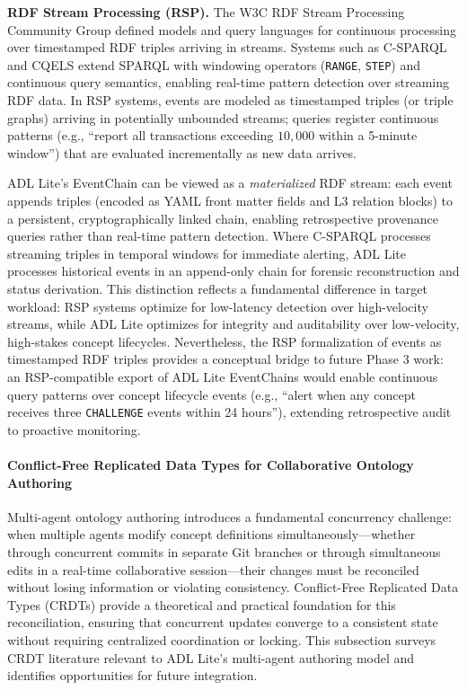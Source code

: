 \textbf{RDF Stream Processing (RSP).} The W3C RDF Stream Processing Community Group defined models and query languages for continuous processing over timestamped RDF triples arriving in streams\cite{ref52}. Systems such as C-SPARQL\cite{ref53} and CQELS\cite{ref54} extend SPARQL with windowing operators (\texttt{RANGE}, \texttt{STEP}) and continuous query semantics, enabling real-time pattern detection over streaming RDF data. In RSP systems, events are modeled as timestamped triples (or triple graphs) arriving in potentially unbounded streams; queries register continuous patterns (e.g., ``report all transactions exceeding $10,000$ within a 5-minute window'') that are evaluated incrementally as new data arrives.

ADL Lite's EventChain can be viewed as a \emph{materialized} RDF stream: each event appends triples (encoded as YAML front matter fields and L3 relation blocks) to a persistent, cryptographically linked chain, enabling retrospective provenance queries rather than real-time pattern detection. Where C-SPARQL processes streaming triples in temporal windows for immediate alerting, ADL Lite processes historical events in an append-only chain for forensic reconstruction and status derivation. This distinction reflects a fundamental difference in target workload: RSP systems optimize for low-latency detection over high-velocity streams, while ADL Lite optimizes for integrity and auditability over low-velocity, high-stakes concept lifecycles. Nevertheless, the RSP formalization of events as timestamped RDF triples provides a conceptual bridge to future Phase 3 work: an RSP-compatible export of ADL Lite EventChains would enable continuous query patterns over concept lifecycle events (e.g., ``alert when any concept receives three \texttt{CHALLENGE} events within 24 hours''), extending retrospective audit to proactive monitoring.

\paragraph{Conflict-Free Replicated Data Types for Collaborative Ontology Authoring}\label{conflict-free-replicated-data-types-for-collaborative-ontology-authoring}

Multi-agent ontology authoring introduces a fundamental concurrency challenge: when multiple agents modify concept definitions simultaneously---whether through concurrent commits in separate Git branches or through simultaneous edits in a real-time collaborative session---their changes must be reconciled without losing information or violating consistency. Conflict-Free Replicated Data Types (CRDTs)\cite{ref55} provide a theoretical and practical foundation for this reconciliation, ensuring that concurrent updates converge to a consistent state without requiring centralized coordination or locking. This subsection surveys CRDT literature relevant to ADL Lite's multi-agent authoring model and identifies opportunities for future integration.

